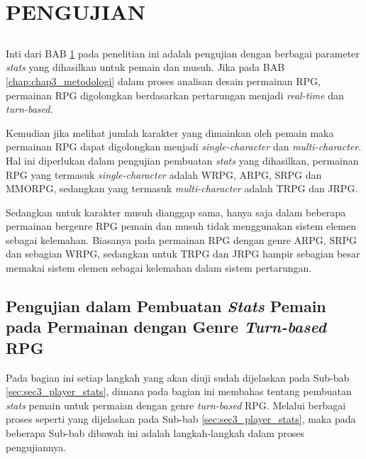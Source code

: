 \chapter{PENGUJIAN}
\label{chap:chap4_eval}
\vspace{1ex}


\section*{}
Inti dari BAB \ref{chap:chap4_eval} pada penelitian ini adalah pengujian dengan berbagai parameter \textit{stats} yang dihasilkan untuk pemain dan musuh. Jika pada BAB \ref{chap:chap3_metodologi} dalam proses analisan desain permainan RPG, permainan RPG digolongkan berdasarkan pertarungan menjadi \textit{real-time} dan \textit{turn-based}. 
\vspace{1ex}

Kemudian jika melihat jumlah karakter yang dimainkan oleh pemain maka permainan RPG dapat digolongkan menjadi \textit{single-character} dan \textit{multi-character}. Hal ini diperlukan dalam pengujian pembuatan \textit{stats} yang dihasilkan, permainan RPG yang termasuk \textit{single-character} adalah WRPG, ARPG, SRPG dan MMORPG, sedangkan yang termasuk \textit{multi-character} adalah TRPG dan JRPG. 
\vspace{1ex}

Sedangkan untuk karakter musuh dianggap sama, hanya saja dalam beberapa permainan bergenre RPG pemain dan musuh tidak menggunakan sistem elemen sebagai kelemahan. Biasanya pada permainan RPG dengan genre ARPG, SRPG dan sebagian WRPG, sedangkan untuk TRPG dan JRPG hampir sebagian besar memakai sistem elemen sebagai kelemahan dalam sistem pertarungan.
\vspace{1ex}

\section{Pengujian dalam Pembuatan \textit{Stats} Pemain pada Permainan dengan Genre \textit{Turn-based} RPG}
\label{sec:sec4_eval_turn-based_player}
\vspace{1ex}

Pada bagian ini setiap langkah yang akan diuji sudah dijelaskan pada Sub-bab \ref{sec:sec3_player_stats}, dimana pada bagian ini membahas tentang pembuatan \textit{stats} pemain untuk permaian dengan genre \textit{turn-based} RPG. Melalui berbagai proses seperti yang dijelaskan pada Sub-bab \ref{sec:sec3_player_stats}, maka pada beberapa Sub-bab dibawah ini adalah langkah-langkah dalam proses pengujiannya.
\vspace{1ex}


